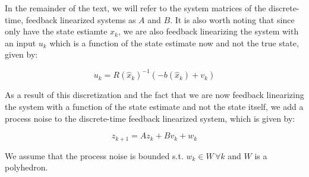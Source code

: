 In the remainder of the text, we will refer to the system matrices of the discrete-time, feedback linearized systems as $A$ and $B$. It is also worth noting that since only have the state estiamte $x_k$, we are also feedback linearizing the system with an input $u_k$ which is a function of the state estimate now and not the true state, given by:

\begin{equation}
\label{eq:noisy_input}
u_k = R(\hat{x}_k)^{-1}(-b(\hat{x}_k) + v_k)
\end{equation}

As a result of this discretization and the fact that we are now feedback linearizing the system with a function of the state estimate and not the state itself, we add a process noise to the discrete-time feedback linearized system, which is given by:

\begin{equation}
z_{k+1} = Az_k + Bv_k + w_k
\end{equation}

We assume that the process noise is bounded s.t. $w_k \in W\, \forall k$ and $W$ is a polyhedron.
